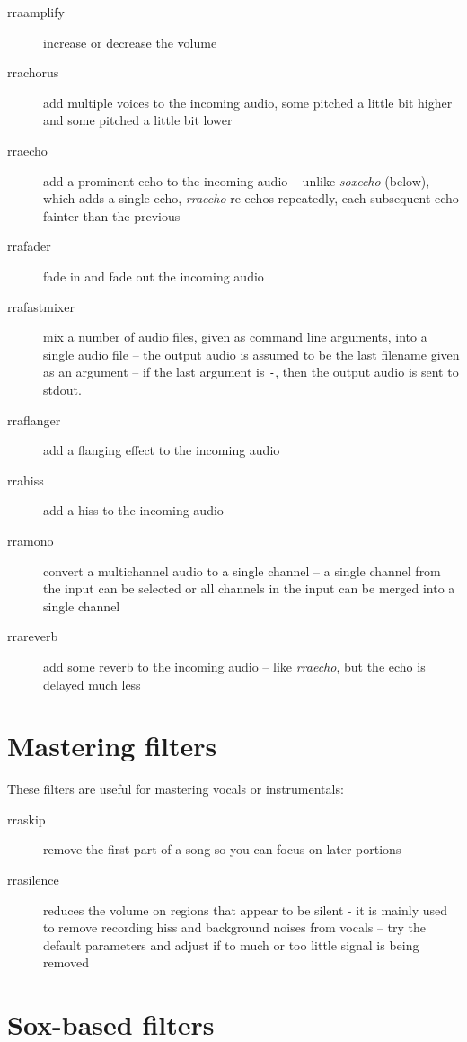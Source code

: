 \documentclass{article}
\begin{document}
\begin{description}
\item[rraamplify]
increase or decrease the volume
\item[rrachorus]
add multiple voices to the incoming audio, some pitched a little bit higher 
and some pitched a little bit lower
\item[rraecho]
add a prominent echo to the incoming audio -- unlike {\it soxecho} (below),
which adds a single echo,
{\it rraecho} re-echos repeatedly,
each subsequent echo fainter than the previous
\item[rrafader]
fade in and fade out the incoming audio
\item[rrafastmixer]
mix a number of audio files, given as command line arguments, into a single
audio file -- the output audio is assumed to be the last filename given as
an argument -- if the last argument is \verb!-!, then the output audio is sent
to stdout.
\item[rraflanger]
add a flanging effect to the incoming audio
\item[rrahiss]
add a hiss to the incoming audio
\item[rramono]
convert a multichannel audio to a single channel -- a single channel from
the input can be selected or all channels in the input can be merged into
a single channel
\item[rrareverb] add some reverb to the incoming audio --
like {\it rraecho}, but the echo is delayed much less
\end{description}

\section*{Mastering filters}

These filters are useful for mastering vocals or instrumentals:

\begin{description}
\item[rraskip]
remove the first part of a song so you can focus on later portions
\item[rrasilence]
reduces the volume on regions that appear to
be silent - it is mainly used to remove
recording hiss and background noises from vocals --
try the default parameters and
adjust if to much or too little signal is being removed
\end{description}

\section*{Sox-based filters}
\end{document}

